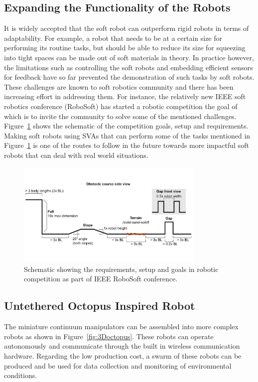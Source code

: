 \subsection{Expanding the Functionality of the Robots}
It is widely accepted that the soft robot can outperform rigid robots in terms of adaptability. For example, a robot that needs to be at a certain size for performing its routine tasks, but should be able to reduce its size for squeezing into tight spaces can be made out of soft materials in theory. In practice however, the limitations such as controlling the soft robots and embedding efficient sensors for feedback have so far prevented the demonstration of such tasks by soft robots. These challenges are known to soft robotics community and there has been increasing effort in addressing them. For instance, the relatively new IEEE soft robotics conference (RoboSoft) has started a robotic competition the goal of which is to invite the community to solve some of the mentioned challenges. Figure~\ref{fig:sorocomp} shows the schematic of the competition goals, setup and requirements. Making soft robots using SVAs that can perform some of the tasks mentioned in Figure~\ref{fig:sorocomp} is one of the routes to follow in the future towards more impactful soft robots that can deal with real world situations. 
\begin{figure}[!t]
\centering
\includegraphics[width=0.8\textwidth]{sorocomp.pdf}
    \caption[SoRo robotic competition]{Schematic showing the requirements, setup and goals in robotic competition as part of IEEE RoboSoft conference.}
    \label{fig:sorocomp}
\end{figure}

\subsection{Untethered Octopus Inspired Robot}
The miniature continuum manipulators can be assembled into more complex robots as shown in Figure~\ref{fig:3Doctopus}. These robots can operate autonomously and communicate through the built in wireless communication hardware. Regarding the low production cost, a swarm of these robots can be produced and be used for data collection and monitoring of environmental conditions. 

